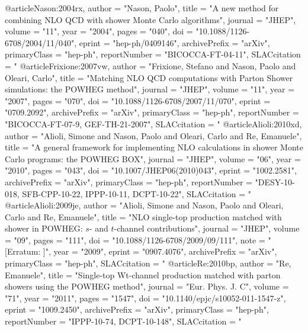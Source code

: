 @article{Nason:2004rx,
      author         = "Nason, Paolo",
      title          = "{A new method for combining NLO QCD with shower Monte
                        Carlo algorithms}",
      journal        = "JHEP",
      volume         = "11",
      year           = "2004",
      pages          = "040",
      doi            = "10.1088/1126-6708/2004/11/040",
      eprint         = "hep-ph/0409146",
      archivePrefix  = "arXiv",
      primaryClass   = "hep-ph",
      reportNumber   = "BICOCCA-FT-04-11",
      SLACcitation   = "%
}
@article{Frixione:2007vw,
      author         = "Frixione, Stefano and Nason, Paolo and Oleari, Carlo",
      title          = "{Matching NLO QCD computations with Parton Shower
                        simulations: the POWHEG method}",
      journal        = "JHEP",
      volume         = "11",
      year           = "2007",
      pages          = "070",
      doi            = "10.1088/1126-6708/2007/11/070",
      eprint         = "0709.2092",
      archivePrefix  = "arXiv",
      primaryClass   = "hep-ph",
      reportNumber   = "BICOCCA-FT-07-9, GEF-TH-21-2007",
      SLACcitation   = "%
}
@article{Alioli:2010xd,
      author         = "Alioli, Simone and Nason, Paolo and Oleari, Carlo and Re,
                        Emanuele",
      title          = "{A general framework for implementing NLO calculations in
                        shower Monte Carlo programs: the POWHEG BOX}",
      journal        = "JHEP",
      volume         = "06",
      year           = "2010",
      pages          = "043",
      doi            = "10.1007/JHEP06(2010)043",
      eprint         = "1002.2581",
      archivePrefix  = "arXiv",
      primaryClass   = "hep-ph",
      reportNumber   = "DESY-10-018, SFB-CPP-10-22, IPPP-10-11, DCPT-10-22",
      SLACcitation   = "%
}
@article{Alioli:2009je,
      author         = "Alioli, Simone and Nason, Paolo and Oleari, Carlo and Re,
                        Emanuele",
      title          = "{NLO single-top production matched with shower in POWHEG:
                        $s$- and $t$-channel contributions}",
      journal        = "JHEP",
      volume         = "09",
      pages          = "111",
      doi            = "10.1088/1126-6708/2009/09/111",
      note           = "[Erratum: ]",
      year           = "2009",
      eprint         = "0907.4076",
      archivePrefix  = "arXiv",
      primaryClass   = "hep-ph",
      SLACcitation   = "%
}
@article{Re:2010bp,
      author         = "Re, Emanuele",
      title          = "{Single-top Wt-channel production matched with parton
                        showers using the POWHEG method}",
      journal        = "Eur. Phys. J. C",
      volume         = "71",
      year           = "2011",
      pages          = "1547",
      doi            = "10.1140/epjc/s10052-011-1547-z",
      eprint         = "1009.2450",
      archivePrefix  = "arXiv",
      primaryClass   = "hep-ph",
      reportNumber   = "IPPP-10-74, DCPT-10-148",
      SLACcitation   = "%
}

